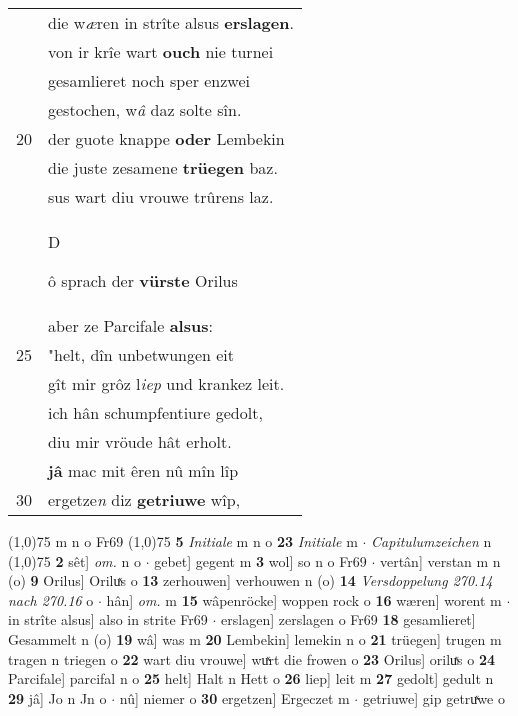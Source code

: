 \documentclass[8pt,a4paper,notitlepage]{article}
\begin{document}
\begin{table}[ht]
\begin{minipage}[t]{0.5\linewidth}
\begin{tabular}{rl}
 & die w\textit{æ}ren in strîte alsus \textbf{erslagen}.\\ 
 & von ir krîe wart \textbf{ouch} nie turnei\\ 
 & gesamlieret noch sper enzwei\\ 
 & gestochen, w\textit{â} daz solte sîn.\\ 
20 & der guote knappe \textbf{oder} Lembekin\\ 
 & die juste zesamene \textbf{trüegen} baz.\\ 
 & sus wart diu vrouwe trûrens laz.\\ 
 & \begin{large}D\end{large}ô sprach der \textbf{vürste} Orilus\\ 
 & aber ze Parcifale \textbf{alsus}:\\ 
25 & "helt, dîn unbetwungen eit\\ 
 & gît mir grôz l\textit{iep} und krankez leit.\\ 
 & ich hân schumpfentiure gedolt,\\ 
 & diu mir vröude hât erholt.\\ 
 & \textbf{jâ} mac mit êren nû mîn lîp\\ 
30 & ergetze\textit{n} diz \textbf{getriuwe} wîp,\\ 
\end{tabular}
\scriptsize
\line(1,0){75} \newline
m n o Fr69 \newline
\line(1,0){75} \newline
\textbf{5} \textit{Initiale} m n o  \textbf{23} \textit{Initiale} m   $\cdot$ \textit{Capitulumzeichen} n  \newline
\line(1,0){75} \newline
\textbf{2} sêt] \textit{om.} n o  $\cdot$ gebet] gegent m \textbf{3} wol] so n o Fr69  $\cdot$ vertân] verstan m n (o) \textbf{9} Orilus] Oriluͯs o \textbf{13} zerhouwen] verhouwen n (o) \textbf{14} \textit{Versdoppelung 270.14 nach 270.16} o   $\cdot$ hân] \textit{om.} m \textbf{15} wâpenröcke] woppen rock o \textbf{16} wæren] worent m  $\cdot$ in strîte alsus] also in strite Fr69  $\cdot$ erslagen] zerslagen o Fr69 \textbf{18} gesamlieret] Gesammelt n (o) \textbf{19} wâ] was m \textbf{20} Lembekin] lemekin n o \textbf{21} trüegen] trugen m tragen n triegen o \textbf{22} wart diu vrouwe] wuͯrt die frowen o \textbf{23} Orilus] oriluͯs o \textbf{24} Parcifale] parcifal n o \textbf{25} helt] Halt n Hett o \textbf{26} liep] leit m \textbf{27} gedolt] gedult n \textbf{29} jâ] Jo n Jn o  $\cdot$ nû] niemer o \textbf{30} ergetzen] Ergeczet m  $\cdot$ getriuwe] gip getruͯwe o \newline
\end{minipage}
\end{table}
\end{document}
